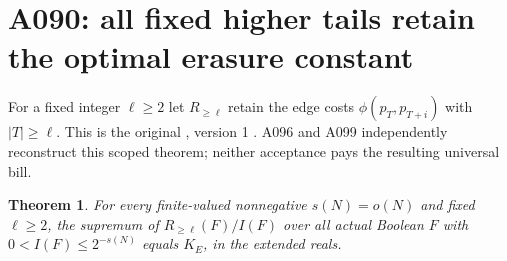 \documentclass[11pt]{article}
\newtheorem{theorem}[lemma]{Theorem}
\begin{document}
\section{A090: all fixed higher tails retain the optimal erasure constant}
\label{sec:tail}
For a fixed integer $\ell\ge2$ let $R_{\ge\ell}$ retain the edge costs
$\phi(p_T,p_{T+i})$ with $|T|\ge\ell$. This is the original
, version 1
\cite{A090c}. A096 and A099 independently reconstruct this scoped theorem;
neither acceptance pays the resulting universal bill.
\begin{theorem}\label{thm:tail}
For every finite-valued nonnegative $s(N)=o(N)$ and fixed $\ell\ge2$,
the supremum of $R_{\ge\ell}(F)/I(F)$ over all actual Boolean $F$
with $0<I(F)\le2^{-s(N)}$ equals $K_E$, in the extended reals.
\end{theorem}
\end{document}
